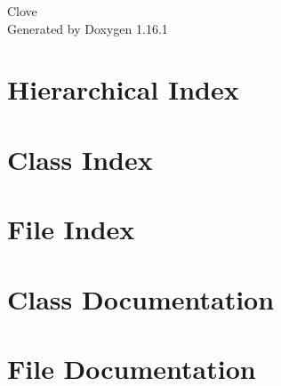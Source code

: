 \documentclass[twoside]{book}
\newcommand{\+}{\discretionary{\mbox{\scriptsize$\hookleftarrow$}}{}{}}
\newcommand{\clearemptydoublepage}{%
    \newpage{\pagestyle{empty}\cleardoublepage}%
  }
\begin{document}
  \raggedbottom
    \hypersetup{pageanchor=false,
                bookmarksnumbered=true,
                pdfencoding=unicode
               }
  \begin{titlepage}
  \vspace*{7cm}
  \begin{center}%
  {\Large Clove}\\
  \vspace*{1cm}
  {\large Generated by Doxygen 1.16.1}\\
  \end{center}
  \end{titlepage}
  \clearemptydoublepage
  \tableofcontents
  \clearemptydoublepage
  \hypersetup{pageanchor=true}
\chapter{Hierarchical Index}

\chapter{Class Index}

\chapter{File Index}

\chapter{Class Documentation}










\chapter{File Documentation}










  \backmatter
  \newpage
  \clearemptydoublepage
  \printindex
\end{document}
